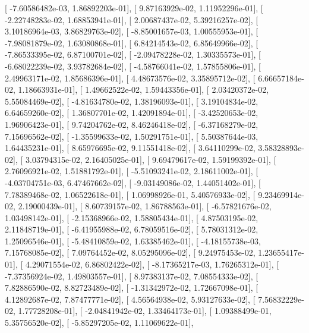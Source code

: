 \documentclass{article}
\begin{document}
       [ -7.60586482e-03,   1.86892203e-01],
       [  9.87163929e-02,   1.11952296e-01],
       [ -2.22748283e-02,   1.68853941e-01],
       [  2.00687437e-02,   5.39216257e-02],
       [  3.10186964e-03,   3.86829763e-02],
       [ -8.85001657e-03,   1.00555953e-01],
       [ -7.98081879e-02,   1.63080868e-01],
       [  6.84214543e-02,   6.85649966e-02],
       [ -7.86533395e-02,   6.87100701e-02],
       [ -2.09478228e-02,   1.30335573e-01],
       [ -6.68022239e-02,   3.93782684e-02],
       [ -4.58766041e-02,   1.57855806e-01],
       [  2.49963171e-02,   1.85686396e-01],
       [  4.48673576e-02,   3.35895712e-02],
       [  6.66657184e-02,   1.18663931e-01],
       [  1.49662522e-02,   1.59443356e-01],
       [  2.03420372e-02,   5.55084469e-02],
       [ -4.81634780e-02,   1.38196093e-01],
       [  3.19104834e-02,   6.64659260e-02],
       [  1.36807701e-02,   1.42091894e-01],
       [ -3.42520653e-02,   1.96906423e-01],
       [  9.74204762e-02,   8.46246418e-02],
       [ -6.37168279e-02,   7.15696562e-02],
       [ -1.35599633e-02,   1.50291751e-01],
       [  5.50387644e-03,   1.64435231e-01],
       [  8.65976695e-02,   9.11551418e-02],
       [  3.64110299e-02,   3.58328893e-02],
       [  3.03794315e-02,   2.16405025e-01],
       [  9.69479617e-02,   1.59199392e-01],
       [  2.76096921e-02,   1.51881792e-01],
       [ -5.51093241e-02,   2.18611002e-01],
       [ -4.03704751e-03,   6.47467662e-02],
       [ -9.03149086e-02,   1.44051402e-01],
       [  7.78389468e-02,   1.06522618e-01],
       [  1.06998926e-01,   5.40576933e-02],
       [  9.23469914e-02,   2.19000439e-01],
       [  8.60739157e-02,   1.86788563e-01],
       [ -6.57821676e-02,   1.03498142e-01],
       [ -2.15368966e-02,   1.58805434e-01],
       [  4.87503195e-02,   2.11848719e-01],
       [ -6.41955988e-02,   6.78059516e-02],
       [  5.78031312e-02,   1.25096546e-01],
       [ -5.48410859e-02,   1.63385462e-01],
       [ -4.18155738e-03,   7.15768085e-02],
       [  7.09764452e-02,   8.05295096e-02],
       [  9.24975453e-02,   1.23655417e-01],
       [  4.29071554e-02,   6.86802422e-02],
       [ -8.17365217e-03,   1.76265312e-01],
       [ -7.37356924e-02,   1.49803557e-01],
       [  8.97383137e-02,   7.08554333e-02],
       [  7.82886590e-02,   8.82723489e-02],
       [ -1.31342972e-02,   1.72667098e-01],
       [  4.12892687e-02,   7.87477771e-02],
       [  4.56564938e-02,   5.93127633e-02],
       [  7.56832229e-02,   1.77728208e-01],
       [ -2.04841942e-02,   1.33464173e-01],
       [  1.09388499e-01,   5.35756520e-02],
       [ -5.85297205e-02,   1.11069622e-01],
\end{document}
